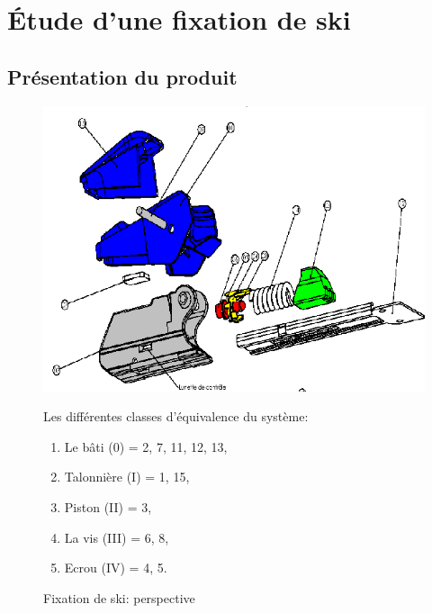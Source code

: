 \newpage

\section{Étude d'une fixation de ski}

\subsection{Présentation du produit}

\begin{figure}[htbp]
\begin{minipage}[c]{.40\linewidth}
\begin{center}
\includegraphics[width=\linewidth]{img/ski1.png}
\caption{Fixation de ski: perspective}
\label{fig:image2}
\end{center}
\end{minipage}
\hfill
\begin{minipage}[c]{.55\linewidth}
Les différentes classes d'équivalence du système:
\begin{enumerate}
 \item Le bâti (0) = {2, 7, 11, 12, 13},
 \item Talonnière (I) = {1, 15},
 \item Piston (II) = {3},
 \item La vis (III) = {6, 8},
 \item Ecrou (IV) = {4, 5}.
\end{enumerate}
\end{minipage}
\end{figure}

